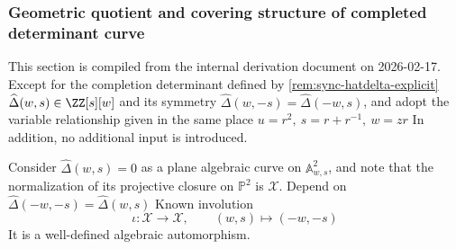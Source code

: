 \subsubsection{Geometric quotient and covering structure of completed determinant curve}\label{subsubsec:sync-kernel-hatdelta-curve-geometry}
This section is compiled from the internal derivation document on 2026-02-17. Except for the completion determinant defined by \ref{rem:sync-hatdelta-explicit}
\(\widehat{\Delta}(w,s)\in\ZZ[s][w]\) and its symmetry
\(\widehat\Delta(w,-s)=\widehat\Delta(-w,s)\), and adopt the variable relationship given in the same place
\(
u=r^2,\ s=r+r^{-1},\ w=zr
\)
In addition, no additional input is introduced.
\par
Consider \(\widehat\Delta(w,s)=0\) as a plane algebraic curve on \(\mathbb{A}^2_{w,s}\), and note that the normalization of its projective closure on \(\mathbb{P}^2\) is \(\mathcal{X}\).
Depend on
\(
\widehat\Delta(-w,-s)=\widehat\Delta(w,s)
\)
Known involution
\[
\iota:\mathcal{X}\longrightarrow\mathcal{X},\qquad (w,s)\longmapsto(-w,-s)
\]
It is a well-defined algebraic automorphism.

